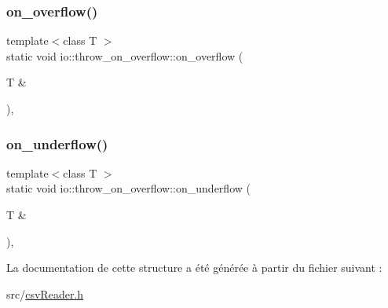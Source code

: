 \subsubsection{\texorpdfstring{on\+\_\+overflow()}{on\_overflow()}}
{\footnotesize\ttfamily template$<$class T $>$ \\
static void io\+::throw\+\_\+on\+\_\+overflow\+::on\+\_\+overflow (\begin{DoxyParamCaption}\item[{T \&}]{ }\end{DoxyParamCaption})\hspace{0.3cm}{\ttfamily [inline]}, {\ttfamily [static]}}

\mbox{\label{structio_1_1throw__on__overflow_a2ae91b1ae3d655c16f7e6a7e9a1abd92}} 
\subsubsection{\texorpdfstring{on\+\_\+underflow()}{on\_underflow()}}
{\footnotesize\ttfamily template$<$class T $>$ \\
static void io\+::throw\+\_\+on\+\_\+overflow\+::on\+\_\+underflow (\begin{DoxyParamCaption}\item[{T \&}]{ }\end{DoxyParamCaption})\hspace{0.3cm}{\ttfamily [inline]}, {\ttfamily [static]}}



La documentation de cette structure a été générée à partir du fichier suivant \+:\begin{DoxyCompactItemize}
\item 
src/\hyperlink{csvReader_8h}{csv\+Reader.\+h}\end{DoxyCompactItemize}
